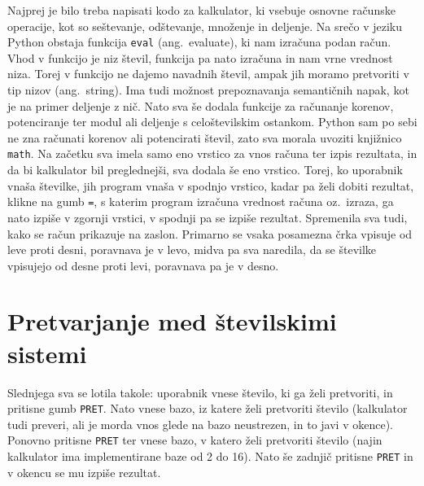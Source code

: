 \documentclass[12pt]{article}
\begin{document}
	Najprej je bilo treba napisati kodo za kalkulator, ki vsebuje osnovne računske operacije, kot so
	seštevanje, odštevanje, množenje in deljenje. Na srečo v jeziku Python obstaja funkcija \texttt{eval} (ang.~evaluate),
	ki nam izračuna podan račun. Vhod v funkcijo je niz števil, funkcija pa nato izračuna in nam vrne vrednost niza. 
	Torej v funkcijo ne dajemo navadnih števil, ampak jih moramo pretvoriti v tip nizov (ang.~string).
	Ima tudi možnost prepoznavanja semantičnih napak, kot je na primer deljenje z nič.\cite{error} Nato sva še dodala funkcije za
	računanje korenov, potenciranje ter modul ali deljenje s celoštevilskim ostankom. Python sam po sebi ne zna
	računati korenov ali potencirati števil, zato sva morala uvoziti knjižnico \texttt{math}. Na začetku sva imela samo eno
	vrstico za vnos računa ter izpis rezultata, in da bi kalkulator bil preglednejši, sva dodala še eno vrstico.
	Torej, ko uporabnik vnaša številke, jih program vnaša v spodnjo vrstico, kadar pa želi dobiti rezultat, klikne
	na gumb \texttt{=}, s katerim program izračuna vrednost računa oz.~izraza, ga nato izpiše v zgornji vrstici, v spodnji pa
	se izpiše rezultat. Spremenila sva tudi, kako se račun prikazuje na zaslon. Primarno se vsaka posamezna črka vpisuje
	od leve proti desni, poravnava je v levo, midva pa sva naredila, da se številke vpisujejo od desne proti levi,\cite{rtol}
	poravnava pa je v desno.
	
	
	\section{Pretvarjanje med številskimi sistemi}
	
	Slednjega sva se lotila takole: uporabnik vnese število, ki ga želi pretvoriti, in pritisne gumb \texttt{PRET}. Nato vnese bazo, iz katere želi pretvoriti število (kalkulator tudi preveri, ali je morda vnos glede na bazo neustrezen, in to javi v okence). Ponovno pritisne \texttt{PRET} ter vnese bazo, v katero želi pretvoriti število (najin kalkulator ima implementirane baze od 2 do 16). Nato še zadnjič pritisne \texttt{PRET} in v okencu se mu izpiše rezultat.
	
\end{document}
